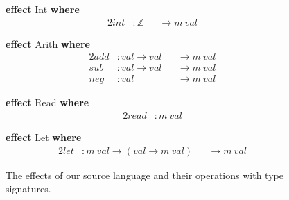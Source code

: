 \documentclass[a4paper,UKenglish,cleveref, autoref, thm-restate, anonymous]{oasics-v2021}
\begin{document}
\begin{figure}[ht]
\begin{minipage}[t]{0.4\textwidth}
\textbf{effect} Int \textbf{where}
\vspace{-1em}
\begin{alignat*}{2}
  \mathit{int} & : \mathbb{Z} && \to m~\mathit{val}
\end{alignat*}

\textbf{effect} Arith \textbf{where}
\vspace{-1em}
\begin{alignat*}{2}
  \mathit{add} & : \mathit{val} \to \mathit{val} && \to m~\mathit{val} \\
  \mathit{sub} & : \mathit{val} \to \mathit{val} && \to m~\mathit{val} \\
  \mathit{neg} & : \mathit{val}                  && \to m~\mathit{val}
\end{alignat*}
\end{minipage}%
%
\begin{minipage}[t]{0.6\textwidth}
\textbf{effect} Read \textbf{where}
\vspace{-1em}
\begin{alignat*}{2}
  \mathit{read} & : m~\mathit{val}
\end{alignat*}

\textbf{effect} Let \textbf{where}
\vspace{-1em}
\begin{alignat*}{2}
  \mathit{let} & : m~\mathit{val} \to (\mathit{val} \to m~\mathit{val}) && \to m~\mathit{val}
\end{alignat*}
\end{minipage}
  \caption{The effects of our source language and their operations with type signatures.}\label{fig:source-ops}
\end{figure}
\end{document}
